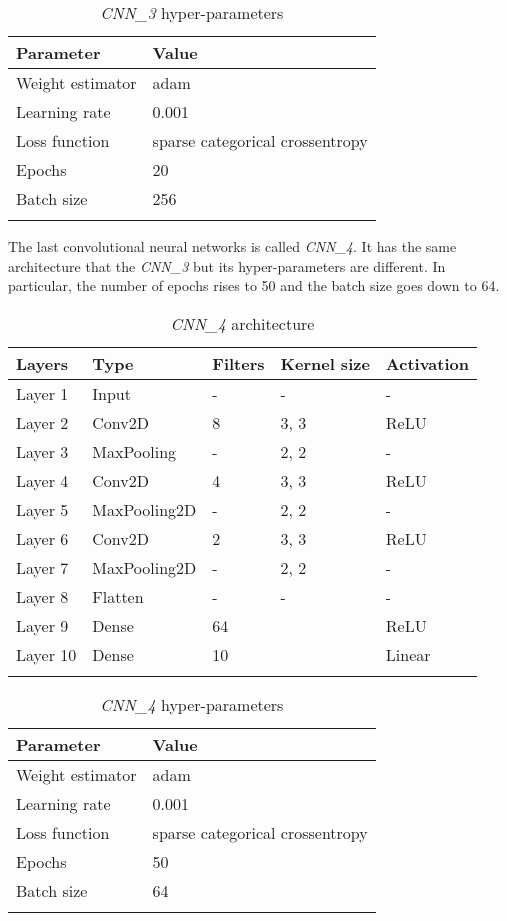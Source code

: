 \begin{longtable}[]{@{}ll@{}}
	\toprule
	\textbf{Parameter} & \textbf{Value}\tabularnewline
	\midrule
	\endhead
	Weight estimator & adam\tabularnewline
	Learning rate & 0.001\tabularnewline
	Loss function & sparse categorical crossentropy\tabularnewline
	Epochs & 20\tabularnewline
	Batch size & 256\tabularnewline
	\bottomrule
		\caption{\emph{CNN\_3} hyper-parameters}
\end{longtable}

\newpage

The last convolutional neural networks is called \emph{CNN\_4}. It has
the same architecture that the \emph{CNN\_3} but its hyper-parameters
are different. In particular, the number of epochs rises to 50 and the
batch size goes down to 64.

\begin{longtable}[]{@{}lllll@{}}
	\toprule
	\textbf{Layers} & \textbf{Type} & \textbf{Filters} & \textbf{Kernel size} &
	\textbf{Activation}\tabularnewline
	\midrule
	\endhead
	Layer 1 & Input & - & - & -\tabularnewline
	Layer 2 & Conv2D & 8 & 3, 3 & ReLU\tabularnewline
	Layer 3 & MaxPooling & - & 2, 2 & -\tabularnewline
	Layer 4 & Conv2D & 4 & 3, 3 & ReLU\tabularnewline
	Layer 5 & MaxPooling2D & - & 2, 2 & -\tabularnewline
	Layer 6 & Conv2D & 2 & 3, 3 & ReLU\tabularnewline
	Layer 7 & MaxPooling2D & - & 2, 2 & -\tabularnewline
	Layer 8 & Flatten & - & - & -\tabularnewline
	Layer 9 & Dense & 64 & & ReLU\tabularnewline
	Layer 10 & Dense & 10 & & Linear\tabularnewline
	\bottomrule
		\caption{\emph{CNN\_4} architecture}
\end{longtable}

\begin{longtable}[]{@{}ll@{}}
	\toprule
	\textbf{Parameter} & \textbf{Value}\tabularnewline
	\midrule
	\endhead
	Weight estimator & adam\tabularnewline
	Learning rate & 0.001\tabularnewline
	Loss function & sparse categorical crossentropy\tabularnewline
	Epochs & 50\tabularnewline
	Batch size & 64\tabularnewline
	\bottomrule
		\caption{\emph{CNN\_4} hyper-parameters}
\end{longtable}